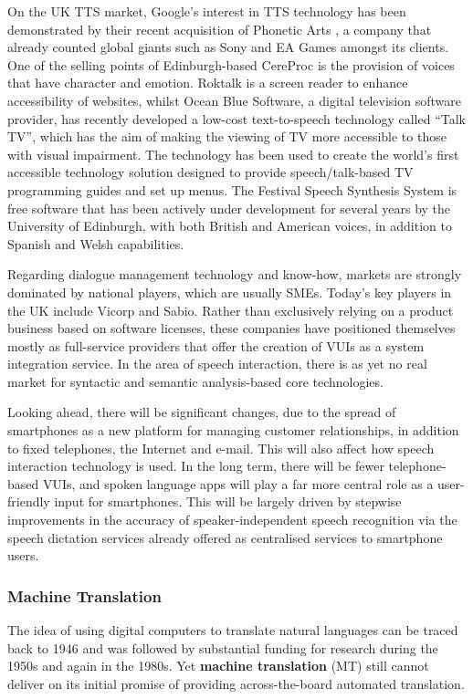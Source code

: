 \begin{multicols}{2}
On the UK TTS market, Google’s interest in TTS technology has been demonstrated by their recent acquisition of Phonetic Arts \cite{PhonArts}, a company that already counted global giants such as Sony and EA Games amongst its clients. One of the selling points of Edinburgh-based CereProc is the provision of voices that have character and emotion. Roktalk is a screen reader to enhance accessibility of websites, whilst Ocean Blue Software, a digital television software provider, has recently developed a low-cost text-to-speech technology called “Talk TV”, which has the aim of making the viewing of TV more accessible to those with visual impairment. The technology has been used to create the world’s first accessible technology solution designed to provide speech/talk-based TV programming guides and set up menus. The Festival Speech Synthesis System \cite{festival} is free software that has been actively under development for several years by the University of Edinburgh, with both British and American voices, in addition to Spanish and Welsh capabilities.

Regarding dialogue management technology and know-how, markets are strongly dominated by national players, which are usually SMEs. Today's key players in the UK include Vicorp and Sabio. Rather than exclusively relying on a product business based on software licenses, these companies have positioned themselves mostly as full-service providers that offer the creation of VUIs as a system integration service. In the area of speech interaction, there is as yet no real market for syntactic and semantic analysis-based core technologies.

Looking ahead, there will be significant changes, due to the spread of smartphones as a new platform for managing customer relationships, in addition to fixed telephones, the Internet and e-mail. This will also affect how speech interaction technology is used. In the long term, there will be fewer telephone-based VUIs, and spoken language apps will play a far more central role as a user-friendly input for smartphones. This will be largely driven by stepwise improvements in the accuracy of speaker-independent speech recognition via the speech dictation services already offered as centralised services to smartphone users.

\subsubsection{Machine Translation}

The idea of using digital computers to translate natural languages can be traced back to 1946 and was followed by substantial funding for research during the 1950s and again in the 1980s. Yet \textbf{machine translation} (MT) still cannot deliver on its initial promise of providing across-the-board automated translation.


\end{multicols}
